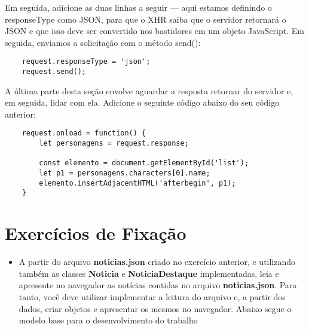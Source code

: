 Em seguida, adicione as duas linhas a seguir — aqui estamos definindo o  responseType como JSON, para que o XHR saiba que o servidor retornará o JSON e que isso deve ser convertido nos bastidores em um objeto JavaScript. Em seguida, enviamos a solicitação com o método send():

\begin{lstlisting}
	request.responseType = 'json';
	request.send();
\end{lstlisting}

A última parte desta seção envolve aguardar a resposta retornar do servidor e, em seguida, lidar com ela. Adicione o seguinte código abaixo do seu código anterior:

\begin{lstlisting}
	request.onload = function() {
		let personagens = request.response;
		
		const elemento = document.getElementById('list');
		let p1 = personagens.characters[0].name;
		elemento.insertAdjacentHTML('afterbegin', p1);
	}
\end{lstlisting}

\section{Exercícios de Fixação}

\begin{itemize}
	\item A partir do arquivo \textbf{noticias.json} criado no exercício anterior, e utilizando também as classes \textbf{Noticia} e \textbf{NoticiaDestaque} implementadas, leia e apresente no navegador as notícias contidas no arquivo \textbf{noticias.json}. Para tanto, você deve utilizar implementar a leitura do arquivo e, a partir dos dados, criar objetos e apresentar os mesmos no navegador. Abaixo segue o modelo base para o desenvolvimento do trabalho
\end{itemize}